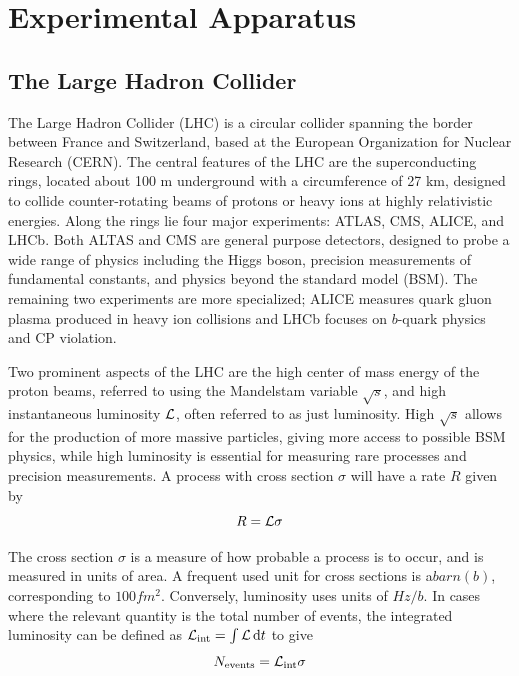 
\chapter{Experimental Apparatus}
\label{chap:exp}

\section{The Large Hadron Collider} \label{sec:LHC}
The Large Hadron Collider (LHC) is a circular collider spanning the border between France and Switzerland, based at the European Organization for Nuclear Research (CERN). The central features of the LHC are the superconducting rings, located about 100 m underground with a circumference of 27 km, designed to collide counter-rotating beams of protons or heavy ions at highly relativistic energies. Along the rings lie four major experiments: ATLAS, CMS, ALICE, and LHCb. Both ALTAS and CMS are general purpose detectors, designed to probe a wide range of physics including the Higgs boson, precision measurements of fundamental constants, and physics beyond the standard model (BSM). The remaining two experiments are more specialized; ALICE measures quark gluon plasma produced in heavy ion collisions and LHCb focuses on $b$-quark physics and CP violation.

Two prominent aspects of the LHC are the high center of mass energy of the proton beams, referred to using the Mandelstam variable $\sqrt{s}$, and high instantaneous luminosity $\mathcal{L}$, often referred to as just luminosity. High $\sqrt{s}$ allows for the production of more massive particles, giving more access to possible BSM physics, while high luminosity is essential for measuring rare processes and precision measurements. A process with cross section $\sigma$ will have a rate $R$ given by
\begin{equation}
	R=\mathcal{L}\sigma
\end{equation}

The cross section $\sigma$ is a measure of how probable a process is to occur, and is measured in units of area. A frequent used unit for cross sections is a$\unit{barn}\unit{(b)}$, corresponding to $100\unit{fm^2}$. Conversely, luminosity uses units of $\unit{Hz/b}$. In cases where the relevant quantity is the total number of events, the integrated luminosity can be defined as $\mathcal{L}_\mathrm{int}=\int{\mathcal{L}\dd{t}}$ to give
\begin{equation}
	N_\mathrm{events} = \mathcal{L}_\mathrm{int}\sigma
\end{equation}

